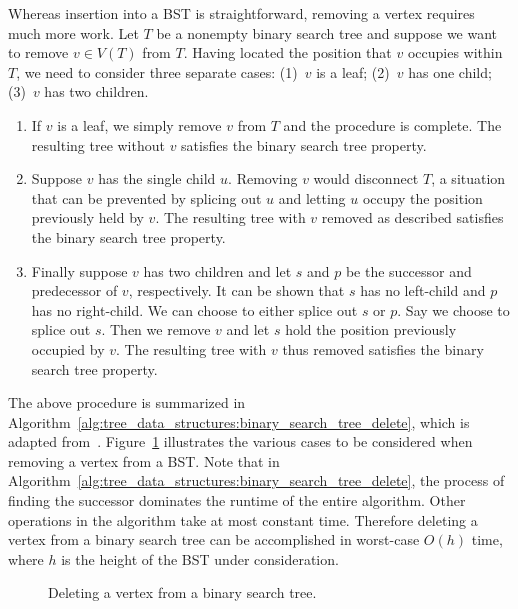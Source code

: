 \noindent
Whereas insertion into a BST is straightforward, removing a vertex
requires much more work. Let $T$ be a nonempty binary search tree and
suppose we want to remove $v \in V(T)$ from $T$. Having located the
position that $v$ occupies within $T$, we need to consider three
separate cases: (1)~$v$ is a leaf; (2)~$v$ has one child; (3)~$v$ has
two children.
\begin{enumerate}
\item If $v$ is a leaf, we simply remove $v$ from $T$ and the
  procedure is complete. The resulting tree without $v$ satisfies the
  binary search tree property.

\item Suppose $v$ has the single child $u$. Removing $v$ would
  disconnect $T$, a situation that can be prevented by splicing out
  $u$ and letting $u$ occupy the position previously held by $v$. The
  resulting tree with $v$ removed as described satisfies the binary
  search tree property.

\item Finally suppose $v$ has two children and let $s$ and $p$ be the
  successor and predecessor of $v$, respectively. It can be shown that
  $s$ has no left-child and $p$ has no right-child. We can choose to
  either splice out $s$ or $p$. Say we choose to splice out $s$. Then
  we remove $v$ and let $s$ hold the position previously occupied by
  $v$. The resulting tree with $v$ thus removed satisfies the binary
  search tree property.
\end{enumerate}
The above procedure is summarized in
Algorithm~\ref{alg:tree_data_structures:binary_search_tree_delete},
which is adapted from~\cite[p.262]{CormenEtAl2001}.
Figure~\ref{fig:tree_data_structures:binary_search_tree_delete}
illustrates the various cases to be considered when removing a vertex
from a BST. Note that in
Algorithm~\ref{alg:tree_data_structures:binary_search_tree_delete},
the process of finding the successor dominates the runtime of the
entire algorithm. Other operations in the algorithm take at most
constant time. Therefore deleting a vertex from a binary search tree
can be accomplished in worst-case $O(h)$ time, where $h$ is the height
of the BST under consideration.

\begin{figure}[!htbp]
\centering

\caption{Deleting a vertex from a binary search tree.}
\label{fig:tree_data_structures:binary_search_tree_delete}
\end{figure}

